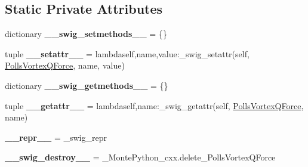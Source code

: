 \subsection*{Static Private Attributes}
\begin{DoxyCompactItemize}
\item 
\hypertarget{classMontePython__cxx_1_1PollsVortexQForce_a2fabda1a0470be1e2f0363592099df53}{}dictionary {\bfseries \+\_\+\+\_\+swig\+\_\+setmethods\+\_\+\+\_\+} = \{\}\label{classMontePython__cxx_1_1PollsVortexQForce_a2fabda1a0470be1e2f0363592099df53}

\item 
\hypertarget{classMontePython__cxx_1_1PollsVortexQForce_ac7d022207494486307a65c6c5d2bb7ee}{}tuple {\bfseries \+\_\+\+\_\+setattr\+\_\+\+\_\+} = lambdaself,name,value\+:\+\_\+swig\+\_\+setattr(self, \hyperlink{classMontePython__cxx_1_1PollsVortexQForce}{Polls\+Vortex\+Q\+Force}, name, value)\label{classMontePython__cxx_1_1PollsVortexQForce_ac7d022207494486307a65c6c5d2bb7ee}

\item 
\hypertarget{classMontePython__cxx_1_1PollsVortexQForce_a62c442635de66bc46335652b746ed542}{}dictionary {\bfseries \+\_\+\+\_\+swig\+\_\+getmethods\+\_\+\+\_\+} = \{\}\label{classMontePython__cxx_1_1PollsVortexQForce_a62c442635de66bc46335652b746ed542}

\item 
\hypertarget{classMontePython__cxx_1_1PollsVortexQForce_a0f4cba17e6900c8ec58e23831403594d}{}tuple {\bfseries \+\_\+\+\_\+getattr\+\_\+\+\_\+} = lambdaself,name\+:\+\_\+swig\+\_\+getattr(self, \hyperlink{classMontePython__cxx_1_1PollsVortexQForce}{Polls\+Vortex\+Q\+Force}, name)\label{classMontePython__cxx_1_1PollsVortexQForce_a0f4cba17e6900c8ec58e23831403594d}

\item 
\hypertarget{classMontePython__cxx_1_1PollsVortexQForce_a8b080e65313e187a6a14f75e798d5f27}{}{\bfseries \+\_\+\+\_\+repr\+\_\+\+\_\+} = \+\_\+swig\+\_\+repr\label{classMontePython__cxx_1_1PollsVortexQForce_a8b080e65313e187a6a14f75e798d5f27}

\item 
\hypertarget{classMontePython__cxx_1_1PollsVortexQForce_ada19e9356c652b5b19ca352cd0b00568}{}{\bfseries \+\_\+\+\_\+swig\+\_\+destroy\+\_\+\+\_\+} = \+\_\+\+Monte\+Python\+\_\+cxx.\+delete\+\_\+\+Polls\+Vortex\+Q\+Force\label{classMontePython__cxx_1_1PollsVortexQForce_ada19e9356c652b5b19ca352cd0b00568}

\end{DoxyCompactItemize}



